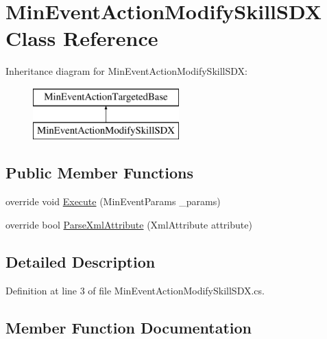 \hypertarget{class_min_event_action_modify_skill_s_d_x}{}\section{Min\+Event\+Action\+Modify\+Skill\+S\+DX Class Reference}
\label{class_min_event_action_modify_skill_s_d_x}
Inheritance diagram for Min\+Event\+Action\+Modify\+Skill\+S\+DX\+:\begin{figure}[H]
\begin{center}
\leavevmode
\includegraphics[height=2.000000cm]{class_min_event_action_modify_skill_s_d_x}
\end{center}
\end{figure}
\subsection*{Public Member Functions}
\begin{DoxyCompactItemize}
\item 
override void \mbox{\hyperlink{class_min_event_action_modify_skill_s_d_x_a36c92e54bc7ac78aec0b96b0b6767681}{Execute}} (Min\+Event\+Params \+\_\+params)
\item 
override bool \mbox{\hyperlink{class_min_event_action_modify_skill_s_d_x_a2f8c470805a87d707487c261bd641ded}{Parse\+Xml\+Attribute}} (Xml\+Attribute attribute)
\end{DoxyCompactItemize}


\subsection{Detailed Description}


Definition at line 3 of file Min\+Event\+Action\+Modify\+Skill\+S\+D\+X.\+cs.



\subsection{Member Function Documentation}
\mbox{\label{class_min_event_action_modify_skill_s_d_x_a36c92e54bc7ac78aec0b96b0b6767681}} 
